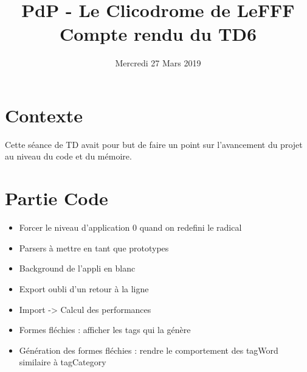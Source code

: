 \documentclass{article}
\title{PdP - Le Clicodrome de LeFFF \\ Compte rendu du TD6}
\author{}
\date{Mercredi 27 Mars 2019}
\begin{document}
\maketitle

\section{Contexte}
Cette séance de TD avait pour but de faire un point sur l'avancement du projet au niveau du code et du mémoire.

\section{Partie Code}
\begin{itemize}
    \item Forcer le niveau d'application 0 quand on redefini le radical
    \item Parsers à mettre en tant que prototypes
    \item Background de l'appli en blanc
    \item Export oubli d'un retour à la ligne
    \item Import -> Calcul des performances
    \item Formes fléchies : afficher les tags qui la génère
    \item Génération des formes fléchies : rendre le comportement des tagWord similaire à tagCategory
\end{itemize}
\end{document}
